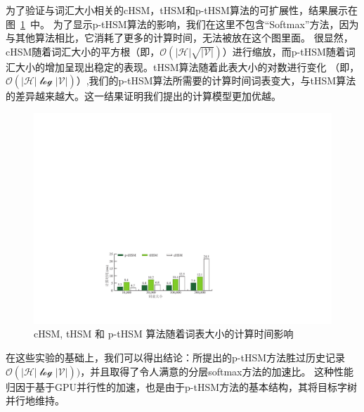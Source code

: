 为了验证与词汇大小相关的cHSM，tHSM和p-tHSM算法的可扩展性，结果展示在图~\ref{fig:hsm_benchmark}~中。 为了显示p-tHSM算法的影响，我们在这里不包含“Softmax”方法，因为与其他算法相比，它消耗了更多的计算时间，无法被放在这个图里面。 很显然，cHSM随着词汇大小的平方根（即，$ \mathcal{O(| H | \sqrt{| V |})} $）进行缩放，而p-tHSM随着词汇大小的增加呈现出稳定的表现。tHSM算法随着此表大小的对数进行变化 （即，$ \mathcal{O(| H | \log{| V |})} $）,我们的p-tHSM算法所需要的计算时间词表变大，与tHSM算法的差异越来越大。这一结果证明我们提出的计算模型更加优越。
\begin{figure}[!ht]
  \centering
  \includegraphics[width=1\columnwidth]{./figures/all_time.pdf}
  \caption{cHSM, tHSM 和 p-tHSM 算法随着词表大小的计算时间影响}\label{fig:hsm_benchmark}
\end{figure}

在这些实验的基础上，我们可以得出结论：所提出的p-tHSM方法胜过历史记录$ \mathcal{O(| H | \log| V |)})$，并且取得了令人满意的分层softmax方法的加速比。 这种性能归因于基于GPU并行性的加速，也是由于p-tHSM方法的基本结构，其将目标字树并行地维持。



